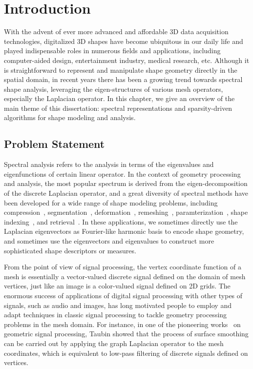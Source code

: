 \chapter{Introduction}

With the advent of ever more advanced and affordable 3D data acquisition
technologies, digitalized 3D shapes have become ubiquitous in our daily
life and played indispensable roles in numerous fields and applications,
including computer-aided design, entertainment industry, medical research, etc.
Although it is straightforward to represent and manipulate shape geometry
directly in the spatial domain, in recent years there has been a growing trend
towards spectral shape analysis, leveraging the eigen-structures of various mesh
operators, especially the Laplacian operator. In this chapter, we give an overview of
the main theme of this dissertation: spectral representations and sparsity-driven
algorithms for shape modeling and analysis.

\section{Problem Statement}

Spectral analysis refers to the analysis in terms of the
eigenvalues and eigenfunctions of certain linear operator. In the context
of geometry processing and analysis, the most popular spectrum is derived
from the eigen-decomposition of the discrete Laplacian operator, and a great
diversity of spectral methods have been developed for a wide range of shape modeling
problems, including compression~\cite{Karni2000}, segmentation~\cite{Liu2007},
deformation~\cite{Rong2008}, remeshing~\cite{dong2006spectral},
paramterization~\cite{Zhou2004}, shape indexing~\cite{Reuter:2006:CAD, Rustamov:2007:LEF},
and retrieval~\cite{Lavoue:2012}. In these applications, we sometimes
directly use the Laplacian eigenvectors as Fourier-like harmonic basis to
encode shape geometry, and sometimes use the eigenvectors and eigenvalues to
construct more sophisticated shape descriptors or measures.

From the point of view of signal processing, the vertex coordinate function of
a mesh is essentially a vector-valued discrete signal defined on the domain of
mesh vertices, just like an image is a color-valued signal defined on 2D grids.
The enormous success of applications of digital signal processing with other types
of signals, such as audio and images, has long motivated people to employ and
adapt techniques in classic signal processing to tackle geometry
processing problems in the mesh domain. For instance, in one of the pioneering
works~\cite{Taubin1995} on geometric signal processing, Taubin showed that the
process of surface smoothing can be carried out by applying the graph Laplacian
operator to the mesh coordinates, which is equivalent to low-pass filtering
of discrete signals defined on vertices.

